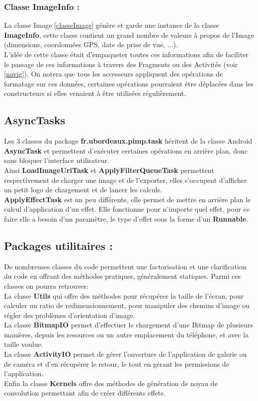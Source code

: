 \subsubsection{Classe \textbf{ImageInfo} :}
La classe Image \ref{classeImage} génère et garde une instance de la classe \textbf{ImageInfo}, cette classe contient un grand nombre de valeurs à propos de l'Image (dimensions, coordonnées GPS, date de prise de vue, ...).
\\
L'idée de cette classe était d'empaqueter toutes ces informations afin de faciliter le passage de ces informations à travers des Fragments ou des Activités (voir \ref{navig}). On notera que tous les accesseurs appliquent des opérations de formatage sur ces données, certaines opérations pourraient être déplacées dans les constructeurs si elles venaient à être utilisées régulièrement.

\subsection{AsyncTasks}
Les 3 classes du package \textbf{fr.ubordeaux.pimp.task} héritent de la classe Android \textbf{AsyncTask} et permettent d'exécuter certaines opérations en arrière plan, donc sans bloquer l'interface utilisateur.
\\
Ainsi \textbf{LoadImageUriTask} et \textbf{ApplyFilterQueueTask} permettent respectivement de charger une image et de l'exporter, elles s'occupent d'afficher un petit logo de chargement et de lancer les calculs.
\\
\textbf{ApplyEffectTask} est un peu différente, elle permet de mettre en arrière plan le calcul d'application d'un effet. Elle fonctionne pour n'importe quel effet, pour ce faire elle a besoin d'un paramètre, le type d'effet sous la forme d'un \textbf{Runnable}.

\subsection{Packages utilitaires :}
De nombreuses classes du code permettent une factorisation et une clarification du code en offrant des méthodes pratiques, généralement statiques. Parmi ces classes on pourra retrouver:
\\

La classe \textbf{Utils} qui offre des méthodes pour récupérer la taille de l'écran, pour calculer un ratio de redimensionnement, pour manipuler des chemins d'image ou régler des problèmes d'orientation d'image.
\\

La classe \textbf{BitmapIO} permet d'effectuer le chargement d'une Bitmap de plusieurs manières, depuis les resources ou un autre emplacement du téléphone, et avec la taille voulue.
\\

La classe \textbf{ActivityIO} permet de gérer l'ouverture de l'application de galerie ou de caméra et d'en récupérer le retour, le tout en gérant les permissions de l'application.
\\

Enfin la classe \textbf{Kernels} offre des méthodes de génération de noyau de convolution permettant afin de créer différents effets.
